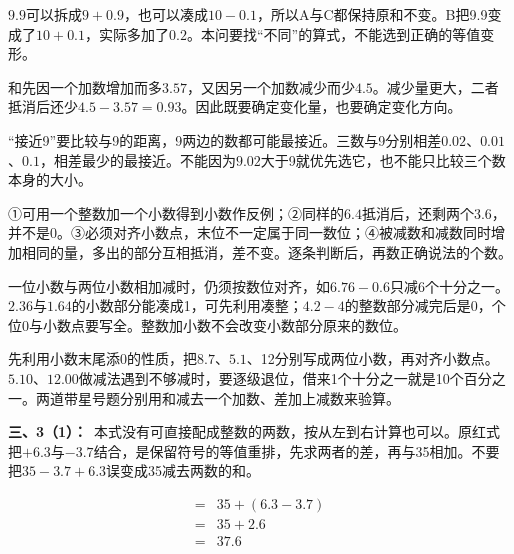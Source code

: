 \documentclass[multi=snippet,border=0pt]{standalone}
\newenvironment{snippet}[3]{\begin{minipage}{#1bp}\color{answerred}\fontsize{#2}{#3}\selectfont\raggedright}{\end{minipage}}
\begin{document}
\begin{snippet}{505}{11.5}{14}\(9.9\)可以拆成\(9+0.9\)，也可以凑成\(10-0.1\)，所以A与C都保持原和不变。B把9.9变成了\(10+0.1\)，实际多加了\(0.2\)。本问要找“不同”的算式，不能选到正确的等值变形。\end{snippet}
\begin{snippet}{505}{11.5}{14}和先因一个加数增加而多\(3.57\)，又因另一个加数减少而少\(4.5\)。减少量更大，二者抵消后还少\(4.5-3.57=0.93\)。因此既要确定变化量，也要确定变化方向。\end{snippet}
\begin{snippet}{505}{11.5}{14}“接近9”要比较与9的距离，9两边的数都可能最接近。三数与9分别相差\(0.02\)、\(0.01\)、\(0.1\)，相差最少的最接近。不能因为\(9.02\)大于9就优先选它，也不能只比较三个数本身的大小。\end{snippet}
\begin{snippet}{505}{11.5}{14}①可用一个整数加一个小数得到小数作反例；②同样的\(6.4\)抵消后，还剩两个\(3.6\)，并不是0。③必须对齐小数点，末位不一定属于同一数位；④被减数和减数同时增加相同的量，多出的部分互相抵消，差不变。逐条判断后，再数正确说法的个数。\end{snippet}
\begin{snippet}{505}{11.5}{14}一位小数与两位小数相加减时，仍须按数位对齐，如\(6.76-0.6\)只减6个十分之一。\(2.36\)与\(1.64\)的小数部分能凑成1，可先利用凑整；\(4.2-4\)的整数部分减完后是0，个位0与小数点要写全。整数加小数不会改变小数部分原来的数位。\end{snippet}
\begin{snippet}{505}{11.5}{14}先利用小数末尾添0的性质，把\(8.7\)、\(5.1\)、12分别写成两位小数，再对齐小数点。\(5.10\)、\(12.00\)做减法遇到不够减时，要逐级退位，借来1个十分之一就是10个百分之一。两道带星号题分别用和减去一个加数、差加上减数来验算。\end{snippet}
\begin{snippet}{505}{11.5}{14}\textbf{三、3（1）：}\ 本式没有可直接配成整数的两数，按从左到右计算也可以。原红式把\(+6.3\)与\(-3.7\)结合，是保留符号的等值重排，先求两者的差，再与35相加。不要把\(35-3.7+6.3\)误变成35减去两数的和。\end{snippet}
\begin{snippet}{182.0}{10.5}{12.8}\[\begin{aligned}={}&35+(6.3-3.7)\\={}&35+2.6\\={}&37.6\end{aligned}\]\end{snippet}
\end{document}
